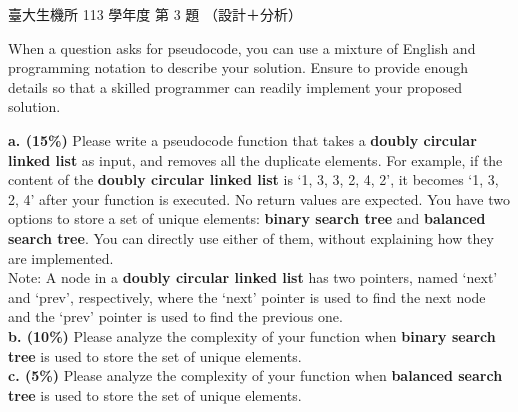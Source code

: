 \begin{pastexam}[label={px:ntu-113-bme-ds-03}]{臺大生機所 113 學年度 第 3 題}
（設計＋分析）

When a question asks for pseudocode, you can use a mixture of English and programming notation to
describe your solution. Ensure to provide enough details so that a skilled programmer can readily
implement your proposed solution.

\textbf{a. (15\%)} Please write a pseudocode function that takes a \textbf{doubly circular linked
list} as input, and removes all the duplicate elements. For example, if the content of the
\textbf{doubly circular linked list} is `1, 3, 3, 2, 4, 2', it becomes `1, 3, 2, 4' after your
function is executed. No return values are expected. You have two options to store a set of unique
elements: \textbf{binary search tree} and \textbf{balanced search tree}. You can directly use either
of them, without explaining how they are implemented.\\
Note: A node in a \textbf{doubly circular linked list} has two pointers, named `next' and `prev',
respectively, where the `next' pointer is used to find the next node and the `prev' pointer is used to
find the previous one.\\
\textbf{b. (10\%)} Please analyze the complexity of your function when \textbf{binary search tree} is
used to store the set of unique elements.\\
\textbf{c. (5\%)} Please analyze the complexity of your function when \textbf{balanced search tree} is
used to store the set of unique elements.
\end{pastexam}

